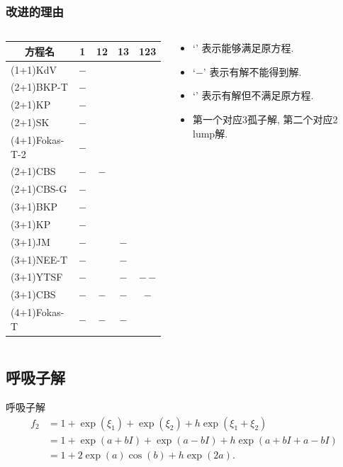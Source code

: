 \documentclass{beamer}
\newcommand{\sbrace}[1]{\left(#1\right)}
\newcommand{\tpa}{\checkmark}
\newcommand{\tpb}{$-$}
\newcommand{\tpc}{\texttimes}
\begin{document}
\begin{frame}
\frametitle{改进的理由}
\begin{columns}
\begin{column}{0.65\textwidth}
\begin{table}
\centering
\small 
\begin{tabular}{lcccc}
\hline
\multicolumn{1}{c}{方程名} & 1 & 12 & 13 & 123 \\ 
\hline
(1+1)KdV & \tpa\tpb & & & \\
(2+1)BKP-T & \tpa\tpb & \tpa\tpa & & \\
(2+1)KP &\tpa\tpb &\tpa\tpa & & \\
(2+1)SK &\tpa\tpb &\tpa\tpa & & \\
(4+1)Fokas-T-2 &\tpa\tpb &\tpa\tpa & & \\
(2+1)CBS & \tpa\tpb & \tpa\tpb & & \\
(2+1)CBS-G & \tpa\tpb & \tpc\tpc & & \\
(3+1)BKP &\tpa\tpb &\tpa\tpa &\tpa\tpa &\tpc\tpc \\
(3+1)KP &\tpa\tpb &\tpa\tpa &\tpa\tpa &\tpc\tpc \\
(3+1)JM &\tpa\tpb &\tpa\tpa &\tpa\tpb &\tpc\tpc \\
(3+1)NEE-T &\tpa\tpb &\tpa\tpa &\tpa\tpb &\tpc\tpc \\
(3+1)YTSF &\tpa\tpb &\tpa\tpa &\tpa\tpb &\tpb\,\tpb \\
(3+1)CBS &\tpa\tpb &\tpa\tpb &\tpa\tpb &\tpa\tpb \\
(4+1)Fokas-T &\tpa\tpb &\tpa\tpb &\tpa\tpb &\tpc\tpc \\
\hline
\end{tabular}
\end{table}
\end{column}
\begin{column}{0.35\textwidth}
\begin{itemize}
\item `\tpa{}' 表示能够满足原方程.
\item `\tpb{}' 表示有解不能得到解.
\item `\tpc{}' 表示有解但不满足原方程.
\item 第一个对应3孤子解, 第二个对应2 lump解.
\end{itemize}
\end{column}
\end{columns}
\end{frame}

\subsection{呼吸子解}
\begin{frame}{呼吸子解}
\begin{equation}
\begin{aligned}
f_2&=1+\exp\sbrace{\xi_1}+\exp\sbrace{\xi_2}+h\exp\sbrace{\xi_1+\xi_2} \\ 
&=1+\exp(a+bI)+\exp(a-bI)+h\exp(a+bI+a-bI) \\ 
&=1+2\exp(a)\cos(b)+h\exp(2a).
\end{aligned}
\end{equation}
\end{frame}
\end{document}
